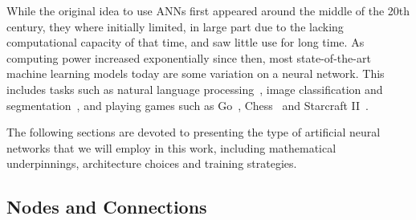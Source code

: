 \documentclass[Thesis.tex]{subfiles}
\begin{document}
While the original idea to use ANNs first appeared around the middle of the 20th
century, they where initially limited, in large part due to the lacking
computational capacity of that time, and saw little use for long time. As
computing power increased exponentially since then, most state-of-the-art
machine learning models today are some variation on a neural network. This
includes tasks such as natural language processing~\cite{bert-2018}, image classification and
segmentation~\cite{gpipe-2018}, and playing games such as Go~\cite{deepmind-alpha-go-zero},
Chess~\cite{deepmind-alpha-zero} and Starcraft II~\cite{vinyals_babuschkin_chung_mathieu_2019}.

The following sections are devoted to presenting the type of artificial neural
networks that we will employ in this work, including mathematical underpinnings,
architecture choices and training strategies.

\subsection{Nodes and Connections}
\end{document}
